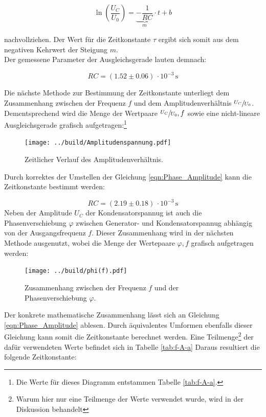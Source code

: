 \begin{equation}
    \ln\left(\frac{U_C}{U_0}\right) = \underbrace{-\frac{1}{RC}}_m \cdot t + b
\end{equation}

\noindent nachvollziehen. Der Wert für die Zeitkonstante $\tau$ ergibt sich somit aus dem negativen Kehrwert der Steigung $m$.\\
Der gemessene Parameter der Ausgleichsgerade lauten demnach:

\begin{equation}
    RC = \left(1.52 \pm 0.06\right)\,\cdot 10^{-3}\,\unit{\second}
\end{equation}

\noindent Die nächste Methode zur Bestimmung der Zeitkonstante unterliegt dem Zusammenhang zwischen der Frequenz $f$ und dem 
Amplitudenverhältnis $\sfrac{U_C}{U_0}$. Dementsprechend wird die Menge der Wertpaare ${\sfrac{U_C}{U_0},f}$ sowie eine 
nicht-lineare Ausgleichsgerade grafisch aufgetragen:\footnote{Die Werte für dieses Diagramm entstammen Tabelle \ref{tab:f-A-a}.}

\begin{figure}
    \centering
    \texttt{[image: ../build/Amplitudenspannung.pdf]}
    \caption{Zeitlicher Verlauf des Amplitudenverhältnis.}
    \label{fig:Amplitudenverlauf}
\end{figure}

\noindent Durch korrektes der Umstellen der Gleichung \eqref{eqn:Phase_Amplitude} kann die Zeitkonstante bestimmt werden:

\begin{equation}
    RC = \left(2.19 \pm 0.18\right)\,\cdot 10^{-3}\,\unit{\second}
\end{equation}
\newpage
\noindent Neben der Amplitude $U_C$ der Kondensatorspannug ist auch die Phasenverschiebung $\varphi$ zwischen Generator- und
Kondensatorspannug abhängig von der Ausgangsfrequenz $f$. Dieser Zusammenhang wird in der nächsten Methode ausgenutzt, wobei 
die Menge der Wertepaare ${\varphi , f}$ grafisch aufgetragen werden: 

\begin{figure}[H]
    \centering
    \texttt{[image: ../build/phi(f).pdf]}
    \caption{Zusammenhang zwischen der Frequenz $f$ und der Phasenverschiebung $\varphi$.}
    \label{fig:Phasenverschiebung}
\end{figure}

\noindent Der konkrete mathematische Zusammenhang lässt sich an 
Gleichung \eqref{eqn:Phase_Amplitude} ablesen. Durch äquivalentes Umformen ebenfalls dieser Gleichung kann somit die Zeitkonstante
berechnet werden. Eine Teilmenge\footnote{Warum hier nur eine Teilmenge der Werte verwendet wurde, wird in der Diskussion behandelt} der dafür verwendeten Werte befindet sich in Tabelle \ref{tab:f-A-a}
Daraus resultiert die folgende Zeitkonstante:

